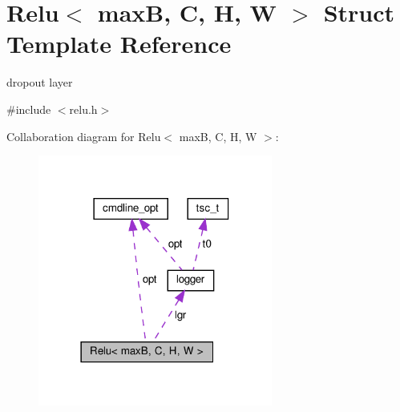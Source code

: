 \hypertarget{structRelu}{}\section{Relu$<$ maxB, C, H, W $>$ Struct Template Reference}
\label{structRelu}


dropout layer  




{\ttfamily \#include $<$relu.\+h$>$}



Collaboration diagram for Relu$<$ maxB, C, H, W $>$\+:
\nopagebreak
\begin{figure}[H]
\begin{center}
\leavevmode
\includegraphics[width=218pt]{structRelu__coll__graph}
\end{center}
\end{figure}
